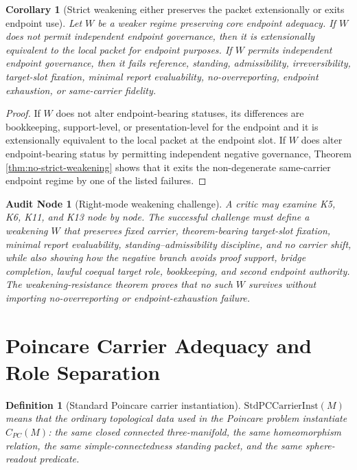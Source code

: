 \documentclass[11pt]{article}
\newtheorem{corollary}[theorem]{Corollary}
\newtheorem{definition}[theorem]{Definition}
\newtheorem{audit}[theorem]{Audit Node}
\newcommand{\CarrierPC}{C_{PC}}
\begin{document}
\begin{corollary}[Strict weakening either preserves the packet extensionally or exits endpoint use]\label{cor:strict-weakening}
Let \(W\) be a weaker regime preserving core endpoint adequacy.  If \(W\) does not permit independent endpoint governance, then it is extensionally equivalent to the local packet for endpoint purposes.  If \(W\) permits independent endpoint governance, then it fails reference, standing, admissibility, irreversibility, target-slot fixation, minimal report evaluability, no-overreporting, endpoint exhaustion, or same-carrier fidelity.
\end{corollary}
\begin{proof}
If \(W\) does not alter endpoint-bearing statuses, its differences are bookkeeping, support-level, or presentation-level for the endpoint and it is extensionally equivalent to the local packet at the endpoint slot.  If \(W\) does alter endpoint-bearing status by permitting independent negative governance, Theorem \ref{thm:no-strict-weakening} shows that it exits the non-degenerate same-carrier endpoint regime by one of the listed failures.
\end{proof}

\begin{audit}[Right-mode weakening challenge]
A critic may examine K5, K6, K11, and K13 node by node.  The successful challenge must define a weakening \(W\) that preserves fixed carrier, theorem-bearing target-slot fixation, minimal report evaluability, standing--admissibility discipline, and no carrier shift, while also showing how the negative branch avoids proof support, bridge completion, lawful coequal target role, bookkeeping, and second endpoint authority.  The weakening-resistance theorem proves that no such \(W\) survives without importing no-overreporting or endpoint-exhaustion failure.
\end{audit}

\section{Poincare Carrier Adequacy and Role Separation}\label{sec:carrier-adequacy}

\begin{definition}[Standard Poincare carrier instantiation]
\(\mathrm{StdPCCarrierInst}(M)\) means that the ordinary topological data used in the Poincare problem instantiate \(\CarrierPC(M)\): the same closed connected three-manifold, the same homeomorphism relation, the same simple-connectedness standing packet, and the same sphere-readout predicate.
\end{definition}
\end{document}
